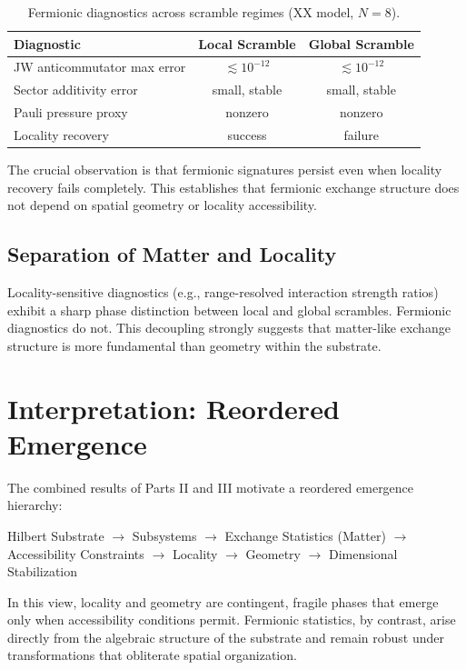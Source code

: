 \documentclass[11pt]{article}
\begin{document}
\begin{table}[h]
\centering
\caption{Fermionic diagnostics across scramble regimes (XX model, $N=8$).}
\label{tab:fermion_evidence}
\begin{tabular}{lcc}
\toprule
Diagnostic & Local Scramble & Global Scramble \\
\midrule
JW anticommutator max error & $\lesssim 10^{-12}$ & $\lesssim 10^{-12}$ \\
Sector additivity error & small, stable & small, stable \\
Pauli pressure proxy & nonzero & nonzero \\
Locality recovery & success & failure \\
\bottomrule
\end{tabular}
\end{table}

The crucial observation is that fermionic signatures persist even when locality recovery fails completely. This establishes that fermionic exchange structure does not depend on spatial geometry or locality accessibility.

\subsection{Separation of Matter and Locality}
Locality-sensitive diagnostics (e.g., range-resolved interaction strength ratios) exhibit a sharp phase distinction between local and global scrambles. Fermionic diagnostics do not. This decoupling strongly suggests that matter-like exchange structure is more fundamental than geometry within the substrate.

\section{Interpretation: Reordered Emergence}
The combined results of Parts II and III motivate a reordered emergence hierarchy:

\begin{center}
Hilbert Substrate $\rightarrow$ Subsystems $\rightarrow$ Exchange Statistics (Matter) $\rightarrow$ Accessibility Constraints $\rightarrow$ Locality $\rightarrow$ Geometry $\rightarrow$ Dimensional Stabilization
\end{center}

In this view, locality and geometry are contingent, fragile phases that emerge only when accessibility conditions permit. Fermionic statistics, by contrast, arise directly from the algebraic structure of the substrate and remain robust under transformations that obliterate spatial organization.
\end{document}
